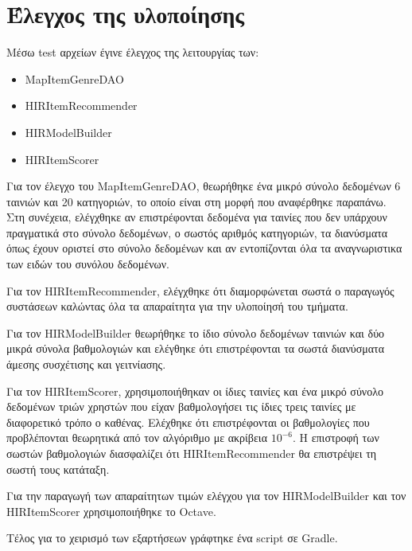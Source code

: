 \section{Έλεγχος της υλοποίησης}
Μέσω {\en test} αρχείων έγινε έλεγχος της λειτουργίας των:
\begin{itemize}
\item {\en MapItemGenreDAO}
\item {\en HIRItemRecommender}
\item {\en HIRModelBuilder}
\item {\en HIRItemScorer}
\end{itemize}\par
Για τον έλεγχο του {\en MapItemGenreDAO}, θεωρήθηκε ένα μικρό σύνολο δεδομένων 6 ταινιών και 20 κατηγοριών, το οποίο είναι στη μορφή που αναφέρθηκε παραπάνω. Στη συνέχεια, ελέγχθηκε αν επιστρέφονται δεδομένα για ταινίες που δεν υπάρχουν πραγματικά στο σύνολο δεδομένων, ο σωστός αριθμός κατηγοριών, τα διανύσματα όπως έχουν οριστεί στο σύνολο δεδομένων και αν εντοπίζονται όλα τα αναγνωριστικα των ειδών του συνόλου δεδομένων. \par
Για τον {\en HIRItemRecommender}, ελέγχθηκε ότι διαμορφώνεται σωστά ο παραγωγός συστάσεων καλώντας όλα τα απαραίτητα για την υλοποίησή του τμήματα.\par
Για τον {\en HIRModelBuilder} θεωρήθηκε το ίδιο σύνολο δεδομένων ταινιών και δύο μικρά σύνολα βαθμολογιών και ελέγθηκε ότι επιστρέφονται τα σωστά διανύσματα άμεσης συσχέτισης και γειτνίασης. \par
Για τον {\en HIRItemScorer}, χρησιμοποιήθηκαν οι ίδιες ταινίες και ένα μικρό σύνολο δεδομένων τριών χρηστών που είχαν βαθμολογήσει τις ίδιες τρεις ταινίες με διαφορετικό τρόπο ο καθένας. Ελέχθηκε ότι επιστρέφονται οι βαθμολογίες που προβλέπονται θεωρητικά από τον αλγόριθμο με ακρίβεια $10^{-6}$. Η επιστροφή των σωστών βαθμολογιών διασφαλίζει ότι {\en HIRItemRecommender} θα επιστρέψει τη σωστή τους κατάταξη. \par
Για την παραγωγή των απαραίτητων τιμών ελέγχου για τον {\en HIRModelBuilder} και τον {\en HIRItemScorer} χρησιμοποιήθηκε το {\en Octave}.\par
Τέλος για το χειρισμό των εξαρτήσεων γράφτηκε ένα {\en script} σε {\en Gradle}.
